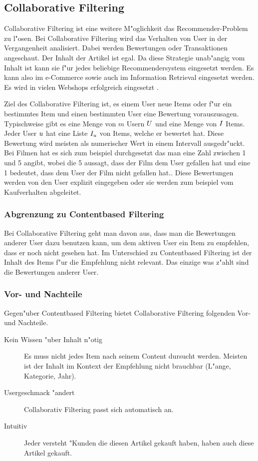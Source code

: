 \documentclass[a4paper, 12pt]{article}
\begin{document}
\subsection{Collaborative Filtering}
\label{sec:collaborativefiltering}

Collaborative Filtering ist eine weitere M"oglichkeit das Re\-commender-Prob\-lem zu l"osen. Bei Collaborative Filtering wird das Verhalten von User in der Vergangenheit analisiert. Dabei werden Bewertungen oder Transaktionen angeschaut. Der Inhalt der Artikel ist egal. Da diese Strategie unab"angig vom Inhalt ist kann sie f"ur jedes beliebige Recommendersystem eingesetzt werden. Es kann also im e-Commerce sowie auch im Information Retrieval eingesetzt werden.  Es wird in vielen Webshops erfolgreich eingesetzt \cite{sarwar01}. 

Ziel des Collaborative Filtering ist, es einem User neue Items oder f"ur ein bestimmtes Item und einen bestimmten User eine Bewertung vorauszusagen. Typischweise gibt es eine Menge von $m$ Usern  $\mathnormal{U}$ und eine Menge von $ \mathnormal{I} $ Items. Jeder User $\mathnormal{u}$ hat eine Liste $\mathnormal{I_u}$ von Items, welche er bewertet hat. Diese Bewertung wird meisten als numerischer Wert in einem Intervall ausgedr"uckt. Bei Filmen hat es sich zum beispiel durchgesetzt das man eine Zahl zwischen 1 und 5 angibt, wobei die 5 aussagt, dass der Film dem User gefallen hat und eine 1 bedeutet, dass dem User der Film nicht gefallen hat.. Diese Bewertungen werden von den User explizit eingegeben oder sie werden zum beispiel vom Kaufverhalten abgeleitet.

\subsubsection{Abgrenzung zu Contentbased Filtering}
\label{sec:definitioncf}

Bei Collaborative Filtering geht man davon aus, dass man die Bewertungen anderer User dazu benutzen kann, um dem aktiven User ein Item zu empfehlen, dass er noch nicht gesehen hat. Im Unterschied zu Contentbased Filtering ist der Inhalt des Items f"ur die Empfehlung nicht relevant. Das einzige was z"ahlt sind die Bewertungen anderer User.

\subsubsection{Vor- und Nachteile}
\label{sec:advandage}

Gegen"uber Contentbased Filtering bietet Collaborative Filtering folgenden Vor- und Nachteile.
\begin{description}
\item[Kein Wissen "uber Inhalt n"otig] Es muss nicht jedes Item nach seinem Content dursucht werden. Meisten ist der Inhalt im Kontext der Empfehlung nicht brauchbar (L"ange, Kategorie, Jahr).
\item[Usergeschmack "andert] Collaborativ Filtering passt sich automatisch an.
\item[Intuitiv] Jeder versteht "Kunden die diesen Artikel gekauft haben, haben auch diese Artikel gekauft.
\end{description}
\end{document}
